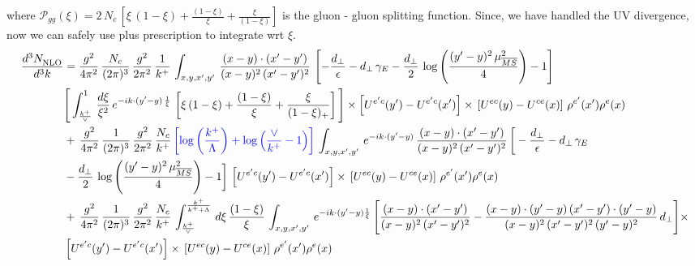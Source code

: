 \documentclass[9pt]{article}
\numberwithin{equation}{section}
\begin{document}
where $\mathcal{P}_{gg}(\xi) = 2\,N_{c}\,\left[\xi\,(1-\xi)+\frac{(1-\xi)}{\xi}+\frac{\xi}{(1-\xi)}\right]$ is the gluon - gluon splitting function. Since, we have handled the UV divergence, now we can safely use plus prescription to integrate wrt $\xi$. 
\begin{align}
    \frac{d^{3}N_{\rm NLO}^{\rm}}{d^{3}k}  & = \frac{g^{2}}{4\pi^{2}}\, \frac{N_{c}}{(2\pi)^{3}}\,\frac{g^{2}}{2\pi^{2}}\, \frac{1}{k^{+}}\,\int_{x,y,x',y'}\,\frac{(x-y)\cdot (x'-y')}{(x-y)^{2}\,(x'-y')^{2}}\,\left[-\frac{d_{\perp}}{\epsilon}-d_{\perp}\,\gamma_{E}-\frac{d_{\perp}}{2}\,\log{\left(\frac{(y'-y)^{2}\,\mu^{2}_{\overline{MS}}}{4}\right)}-1\right]\,\notag \\ & \Bigg[\int_{\frac{k^{+}}{\vee}}^{1}\,\frac{d\xi}{\xi^{2}}\,e^{-ik\cdot (y'-y)\,\frac{1}{\xi}}\,\left[\xi\,(1-\xi)+\frac{(1-\xi)}{\xi}+\frac{\xi}{(1-\xi)_{+}}\right]\Bigg]\times \left[U^{e'c}(y') - U^{e'c}(x')\right] \times\, \left[U^{ec}(y) - U^{ce}(x)\right]\, \rho^{e'}(x') \rho^{e}(x)\notag \\ &  +\, \frac{g^{2}}{4\pi^{2}}\, \frac{1}{(2\pi)^{3}}\,\frac{g^{2}}{2\pi^{2}}\, \frac{N_{c}}{k^{+}}\,{\color{blue}\left[\log{\left(\frac{k^{+}}{\Lambda}\right)}+\log{\left(\frac{\vee}{k^{+}}-1\right)}\right]}\,\int_{x,y,x',y'}\,e^{-ik\cdot (y'-y)}\,\frac{(x-y)\cdot (x'-y')}{(x-y)^{2}\,(x'-y')^{2}}\,\bigg[-\frac{d_{\perp}}{\epsilon}-d_{\perp}\,\gamma_{E}\notag \\ & -\frac{d_{\perp}}{2}\,\log{\left(\frac{(y'-y)^{2}\,\mu^{2}_{\overline{MS}}}{4}\right)}-1\bigg]\,\left[U^{e'c}(y') - U^{e'c}(x')\right] \times\, \left[U^{ec}(y) - U^{ce}(x)\right]\, \rho^{e'}(x') \rho^{e}(x)\notag \\ & +\,\frac{g^{2}}{4\pi^{2}}\, \frac{1}{(2\pi)^{3}}\,\frac{g^{2}}{2\pi^{2}}\, \frac{N_{c}}{k^{+}}\,\int_{\frac{k^{+}}{\vee}}^{\frac{k^{+}}{k^{+}+\Lambda}}\,d\xi\, \frac{(1-\xi)}{\xi}\, \int_{x,y,x',y'}\,e^{-ik\cdot (y'-y)\frac{1}{\xi}}\,\Bigg[\frac{(x-y)\cdot (x'-y')}{(x-y)^{2}\, (x'-y')^{2}} -\frac{(x-y)\cdot (y'-y)\, (x'-y')\cdot (y'-y)}{(x-y)^{2}\,(x'-y')^{2}\,(y'-y)^{2}}\,d_{\perp}\Bigg]\times\notag \\ &  \left[U^{e'c}(y') - U^{e'c}(x')\right] \times\, \left[U^{ec}(y) - U^{ce}(x)\right]\, \rho^{e'}(x') \rho^{e}(x)
\end{align}
\end{document}
